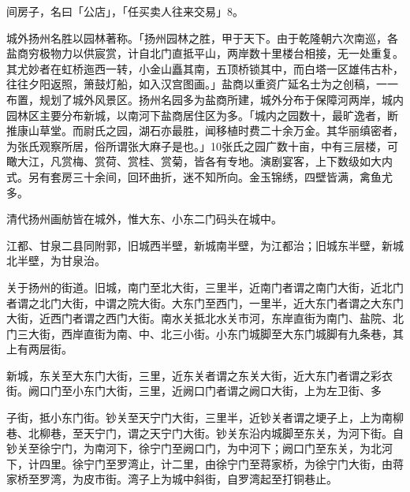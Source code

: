 \vfill
\begin{BookNotes}
\end{BookNotes}

\noindent 间房子，名曰「公店」，「任买卖人往来交易」8。

城外扬州名胜以园林著称。「扬州园林之胜，甲于天下。由于乾隆朝六次南巡，各盐商穷极物力以供宸赏，计自北门直抵平山，两岸数十里楼台相接，无一处重复。其尤妙者在虹桥迤西一转，小金山矗其南，五顶桥锁其中，而白塔一区雄伟古朴，往往夕阳返照，箫鼓灯船，如入汉宫图画。」盐商以重资广延名士为之创稿，一一布置，规划了城外风景区。扬州名园多为盐商所建，城外分布于保障河两岸，城内园林区主要分布新城，以南河下盐商居住区为多。「城内之园数十，最旷逸者，断推康山草堂。而尉氏之园，湖石亦最胜，闻移植时费二十余万金。其华丽缜密者，为张氏观察所居，俗所谓张大麻子是也。」10张氏之园广数十亩，中有三层楼，可瞰大江，凡赏梅、赏荷、赏桂、赏菊，皆各有专地。演剧宴客，上下数级如大内式。另有套房三十余间，回环曲折，迷不知所向。金玉锦绣，四壁皆满，禽鱼尤多。

清代扬州画舫皆在城外，惟大东、小东二门码头在城中。

江都、甘泉二县同附郭，旧城西半壁，新城南半壁，为江都治；旧城东半壁，新城北半壁，为甘泉治。

关于扬州的街道。旧城，南门至北大街，三里半，近南门者谓之南门大街，近北门者谓之北门大街，中谓之院大街。大东门至西门，一里半，近大东门者谓之大东门大街，近西门者谓之西门大街。南水关抵北水关市河，东岸直街为南门、盐院、北门三大街，西岸直街为南、中、北三小街。小东门城脚至大东门城脚有九条巷，其上有两层街。

新城，东关至大东门大街，三里，近东关者谓之东关大街，近大东门者谓之彩衣街。阙口门至小东门大街，三里，近阙口门者谓之阙口大街，上为左卫街、多

\vfill
\begin{BookNotes}
\end{BookNotes}

\noindent 子街，抵小东门街。钞关至天宁门大街，三里半，近钞关者谓之埂子上，上为南柳巷、北柳巷，至天宁门，谓之天宁门大街。钞关东沿内城脚至东关，为河下街。自钞关至徐宁门，为南河下，徐宁门至阙口门，为中河下；阙口门至东关，为北河下，计四里。徐宁门至罗湾止，计二里，由徐宁门至蒋家桥，为徐宁门大街，由蒋家桥至罗湾，为皮市街。湾子上为城中斜街，自罗湾起至打铜巷止。

